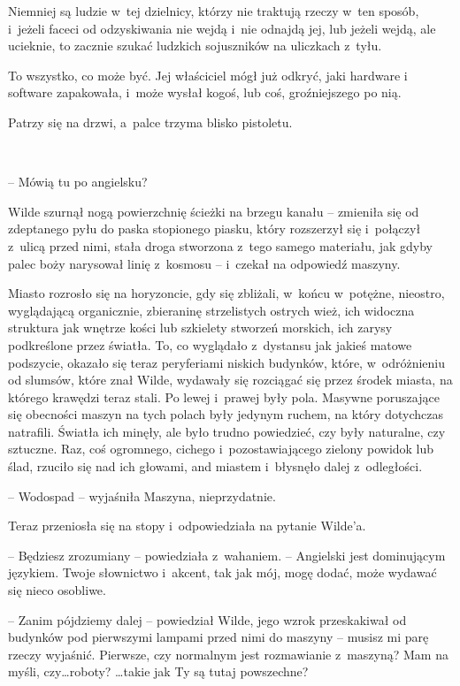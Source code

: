\documentclass[oneside,polish,11pt,sfheadings]{mwbk}
\begin{document}
Niemniej są ludzie w~tej dzielnicy, którzy nie traktują rzeczy w~ten
sposób, i~jeżeli faceci od odzyskiwania nie wejdą i~nie odnajdą jej, lub
jeżeli wejdą, ale ucieknie, to zacznie szukać ludzkich sojuszników na
uliczkach z~tyłu.

To wszystko, co może być. Jej właściciel mógł już odkryć, jaki hardware
i software zapakowała, i~może wysłał kogoś, lub coś, groźniejszego po
nią.

Patrzy się na drzwi, a~palce trzyma blisko pistoletu.

~

-- Mówią tu po angielsku?

Wilde szurnął nogą powierzchnię ścieżki na brzegu kanału -- zmieniła się
od zdeptanego pyłu do paska stopionego piasku, który rozszerzył się i~połączył z~ulicą przed nimi, stała droga stworzona z~tego samego
materiału, jak gdyby palec boży narysował linię z~kosmosu -- i~czekał na
odpowiedź maszyny.

Miasto rozrosło się na horyzoncie, gdy się zbliżali, w~końcu w~potężne,
nieostro, wyglądającą organicznie, zbieraninę strzelistych ostrych wież,
ich widoczna struktura jak wnętrze kości lub szkielety stworzeń
morskich, ich zarysy podkreślone przez światła. To, co wyglądało z~dystansu jak jakieś matowe podszycie, okazało się teraz peryferiami
niskich budynków, które, w~odróżnieniu od slumsów, które znał Wilde,
wydawały się rozciągać się przez środek miasta, na którego krawędzi
teraz stali. Po lewej i~prawej były pola. Masywne poruszające się
obecności maszyn na tych polach były jedynym ruchem, na który dotychczas
natrafili. Światła ich minęły, ale było trudno powiedzieć, czy były
naturalne, czy sztuczne. Raz, coś ogromnego, cichego i~pozostawiającego
zielony powidok lub ślad, rzuciło się nad ich głowami, and miastem i~błysnęło dalej z~odległości.

-- Wodospad -- wyjaśniła Maszyna, nieprzydatnie.

Teraz przeniosła się na stopy i~odpowiedziała na pytanie Wilde'a. 

-- Będziesz zrozumiany -- powiedziała z~wahaniem. -- Angielski jest
dominującym językiem. Twoje słownictwo i~akcent, tak jak mój, mogę
dodać, może wydawać się nieco osobliwe.

-- Zanim pójdziemy dalej -- powiedział Wilde, jego wzrok przeskakiwał od
budynków pod pierwszymi lampami przed nimi do maszyny -- musisz mi parę
rzeczy wyjaśnić. Pierwsze, czy normalnym jest rozmawianie z~maszyną? Mam
na myśli, czy\ldots roboty? \ldots takie jak Ty są tutaj powszechne?
\end{document}
